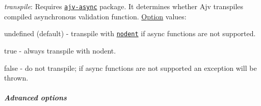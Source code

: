 \begin{DoxyItemize}
\item {\itshape transpile}\+: Requires \href{https://github.com/epoberezkin/ajv-async}{\tt ajv-\/async} package. It determines whether Ajv transpiles compiled asynchronous validation function. \mbox{\hyperlink{structOption}{Option}} values\+:
\begin{DoxyItemize}
\item {\ttfamily undefined} (default) -\/ transpile with \href{https://github.com/MatAtBread/nodent}{\tt nodent} if async functions are not supported.
\item {\ttfamily true} -\/ always transpile with nodent.
\item {\ttfamily false} -\/ do not transpile; if async functions are not supported an exception will be thrown.
\end{DoxyItemize}
\end{DoxyItemize}

\subparagraph*{Advanced options}



